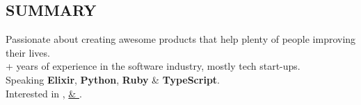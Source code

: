 \subsection*{SUMMARY}

\tbullet Passionate about creating awesome products that help plenty of people improving their lives. \\
+ years of experience in the software industry, mostly tech start-ups. \\
\tbullet Speaking \textbf{Elixir}, \textbf{Python}, \textbf{Ruby} \& \textbf{TypeScript}. \\
\tbullet Interested in \href{https://github.com/ethan605/aws-vpn-client}{},
         \href{https://xkpasswd.ethanify.me}{ \& }.
